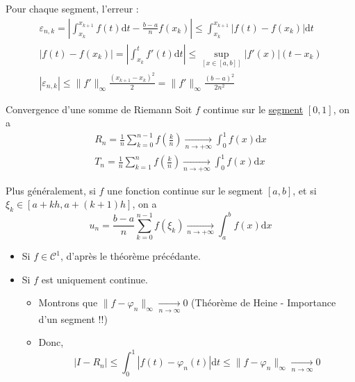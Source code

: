 \begin{myproof}{}{}
Pour chaque segment, l'erreur : 
\begin{gather}
  \varepsilon _{n,k} = \left| \int_{x_k}^{x _{k+1}} f(t) \mathrm{d} t - \frac{b-a}{n} f(x_k) \right| \le \int_{x_k}^{x _{k+1}} |f(t) - f(x_k) | \mathrm{d} t \\ 
  |f(t) - f(x_k) | = \left| \int_{x_k}^{t} f'(t) \mathrm{d} t \right| \le \sup _{[x \in [a,b]]}|f'(x)| ( t- x_k) \\ 
  |\varepsilon _{n,k}|\le \| f' \| _{\infty} \frac{(x _{k+1} - x_k) ^{2}}{2} = \| f' \| _{\infty}  \frac{(b-a) ^{2}}{2 n ^{2}} 
\end{gather}
\end{myproof}

\begin{Theorem}{\color{red} Convergence d'une somme de Riemann}{}
  Soit $f$ continue sur le \underline{segment} $[0,1]$, on a 
\begin{gather}
  R_n = \frac{1}{n} \sum_{k=0}^{n-1} f \left( \frac{k}{n}  \right)  \underset{n \to + \infty}{\longrightarrow}  \int_{0}^{1} f(x) \mathrm{d} x \\ 
  T_n = \frac{1}{n} \sum_{k=1}^{n} f \left( \frac{k}{n}  \right)  \underset{n \to + \infty}{\longrightarrow}  \int_{0}^{1} f(x) \mathrm{d} x
\end{gather}

Plus généralement, si $f$ une fonction continue sur le segment $[a,b]$, et si $\xi_k \in [a+kh, a+ (k+1)h]$, on a 
\begin{equation}
  u_n = \frac{b-a}{n}  \sum_{
    k=0
  }^{n-1} f(\xi_k)  \underset{n \to + \infty}{\longrightarrow}  \int_{a}^{b} f(x) \mathrm{d}x
\end{equation}
\end{Theorem}

\begin{myproof}{}{}
\begin{itemize}

    \item Si $f \in \mathscr{C} ^{1}$, d'après le théorème précédante. 
    \item Si $f$ est uniquement continue. 
      \begin{itemize}

          \item Montrons que $\| f - \varphi_n \| _{\infty}  \underset{n \to \infty}{\longrightarrow} 0$ (Théorème de Heine - Importance d'un segment !!) 

          \item  Donc, 
            \begin{equation}
              |I - R_n | \le \int_{0}^{1} | f(t)- \varphi_n(t) |\mathrm{d} t  \le \| f - \varphi_n \| _{\infty}  \underset{n \to \infty}{\longrightarrow} 0
            \end{equation}

      \end{itemize}

\end{itemize}
\end{myproof}



